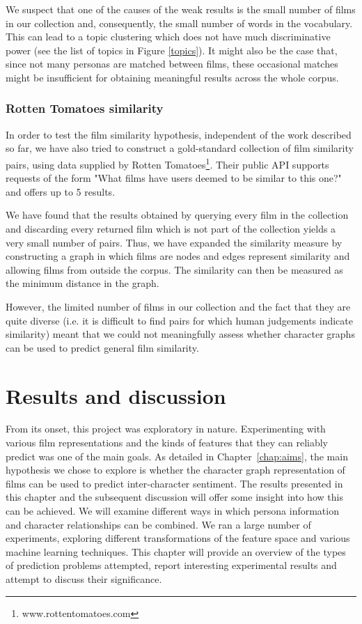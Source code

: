 \documentclass[bsc,frontabs,singlespacing,parskip, twoside]{infthesis}
\begin{document}
We suspect that one of the causes of the weak results is the small number of films in our collection and, consequently, the small number of words in the vocabulary. This can lead to a topic clustering which does not have much discriminative power (see the list of topics in Figure \ref{topics}). It might also be the case that, since not many personas are matched between films, these occasional matches might be insufficient for obtaining meaningful results across the whole corpus.

\subsection{Rotten Tomatoes similarity}
In order to test the film similarity hypothesis, independent of the work described so far, we have also tried to construct a gold-standard collection of film similarity pairs, using data supplied by Rotten Tomatoes\footnote{www.rottentomatoes.com}. Their public API supports requests of the form "What films have users deemed to be similar to this one?" and offers up to 5 results.

We have found that the results obtained by querying every film in the collection and discarding every returned film which is not part of the collection yields a very small number of pairs. Thus, we have expanded the similarity measure by constructing a graph in which films are nodes and edges represent similarity and allowing films from outside the corpus. The similarity can then be measured as the minimum distance in the graph.

However, the limited number of films in our collection and the fact that they are quite diverse (i.e. it is difficult to find pairs for which human judgements indicate similarity) meant that we could not meaningfully assess whether character graphs can be used to predict general film similarity. 

\chapter{Results and discussion}
\label{chap:results}

From its onset, this project was exploratory in nature. Experimenting with various film representations and the kinds of features that they can reliably predict was one of the main goals. As detailed in Chapter~\ref{chap:aims}, the main hypothesis we chose to explore is whether the character graph representation of films can be used to predict inter-character sentiment. The results presented in this chapter and the subsequent discussion will offer some insight into how this can be achieved. We will examine different ways in which persona information and character relationships can be combined. We ran a large number of experiments, exploring different transformations of the feature space and various machine learning techniques. This chapter will provide an overview of the types of prediction problems attempted, report interesting experimental results and attempt to discuss their significance.
\end{document}
